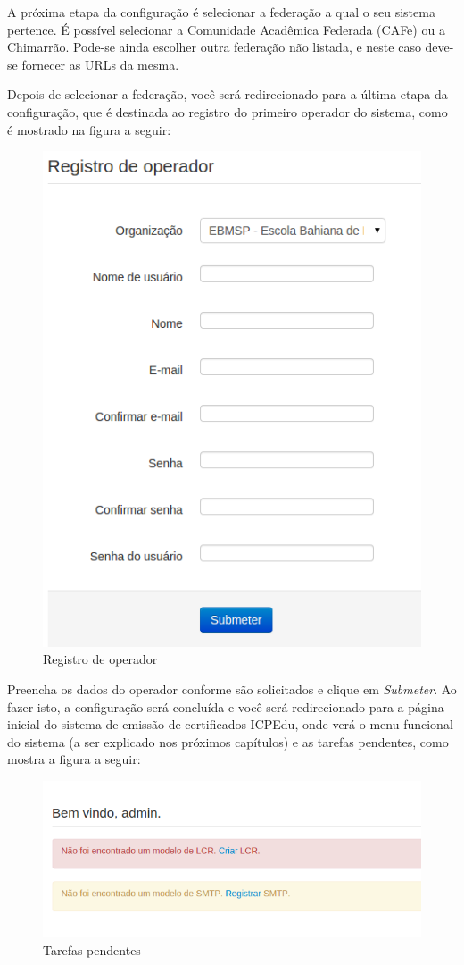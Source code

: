     A próxima etapa da configuração é selecionar a federação a qual o seu sistema pertence. É possível selecionar a Comunidade Acadêmica Federada (CAFe) ou a Chimarrão. Pode-se ainda escolher outra federação não listada, e neste caso deve-se fornecer as URLs da mesma.
    
    Depois de selecionar a federação, você será redirecionado para a última etapa da configuração, que é destinada ao registro do primeiro operador do sistema, como é mostrado na figura a seguir:
    
    \begin{figure}[ht]
     \centering
     \includegraphics[scale=0.5]{images/inicioregistroop.png}
     \caption{Registro de operador}
     \label{fig:inicioregop}
\end{figure}

    Preencha os dados do operador conforme são solicitados e clique em \textit{Submeter}. Ao fazer isto, a configuração será concluída e você será redirecionado para a página inicial do sistema de emissão de certificados ICPEdu, onde verá o menu funcional do sistema (a ser explicado nos próximos capítulos) e as tarefas pendentes, como mostra a figura a seguir:
    
    \begin{figure}[ht]
     \centering
     \includegraphics[scale=0.5]{images/pendencias.png}
     \caption{Tarefas pendentes}
     \label{fig:pendencias}
\end{figure}
